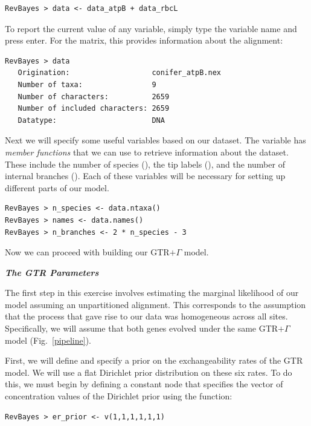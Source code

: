 {\tt \begin{snugshade*}
\begin{lstlisting}
RevBayes > data <- data_atpB + data_rbcL
\end{lstlisting}
\end{snugshade*}}

To report the current value of any variable, simply type the variable name and press enter. For the  matrix, this provides information about the alignment:


{\tt \begin{snugshade*}
\begin{lstlisting}
RevBayes > data
   Origination:                   conifer_atpB.nex
   Number of taxa:                9
   Number of characters:          2659
   Number of included characters: 2659
   Datatype:                      DNA
\end{lstlisting}
\end{snugshade*}}


Next we will specify some useful variables based on our dataset. The variable  has \textit{member functions} that we can use to retrieve information about the dataset. 
These include the number of species (), the tip labels (), and the number of internal branches ().
Each of these variables will be necessary for setting up different parts of our model.
{\tt \begin{snugshade*}
\begin{lstlisting}
RevBayes > n_species <- data.ntaxa()
RevBayes > names <- data.names()	
RevBayes > n_branches <- 2 * n_species - 3 
\end{lstlisting}
\end{snugshade*}}

Now we can proceed with building our GTR$+\Gamma$ model.

\textbf{\textit{The GTR Parameters}}

The first step in this exercise involves estimating the marginal likelihood of our model assuming an unpartitioned alignment. 
This corresponds to the assumption that the process that gave rise to our data was homogeneous across all sites. 
Specifically, we will assume that both genes evolved under the same GTR$+\Gamma$ model (Fig.~\ref{pipeline}). 


First, we will define and specify a prior on the exchangeability rates of the GTR model. We will use a flat Dirichlet prior distribution on these six rates. To do this, we must begin by defining a constant node that specifies the vector of concentration values of the Dirichlet prior using the  function:
{\tt \begin{snugshade*}
\begin{lstlisting}
RevBayes > er_prior <- v(1,1,1,1,1,1) 
\end{lstlisting}
\end{snugshade*}}


